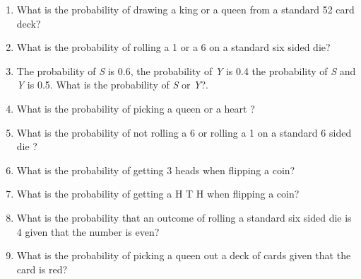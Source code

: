 \documentclass[12pt]{article}
\begin{document}
\begin{enumerate}

\item What is the probability of drawing a king or a queen from a standard 52 card deck?\\   %
\vspace{2em}

\item What is the probability of rolling a 1 or a  6 on a standard six sided die?\\   %
\vspace{2em}

\item The probability of \textit{S} is 0.6, the probability of \textit{Y} is 0.4 the probability of \textit{S} and \textit{Y} is 0.5. What is the probability of \textit{S} or \textit{Y}?. \\  
\vspace{2em}

\item What is the probability of picking a queen or a heart ?\\ %
\vspace{2em}

\item What is the probability of not rolling a 6 or rolling a 1 on a standard 6 sided die ? \\ %
\vspace{2em}

\item What is the probability of getting 3 heads when flipping a coin?\\  %
\vspace{2em}

\item What is the probability of getting a H T H when flipping a coin? \\ %
\vspace{2em}

\item What is the probability that an outcome of rolling a standard six sided die is 4 given that the number is even?\\ %
\vspace{2em}

\item What is the probability of picking a queen out a deck of cards given that the card is red?\\ %
\vspace{2em}


\end{enumerate}
\end{document}
